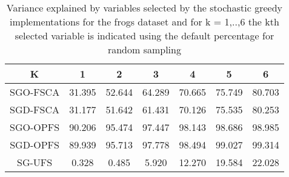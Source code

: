 \begin{table}
	\begin{center}
		\begin{tabular}{c c c c c c c}
			K & 1 & 2 & 3 & 4 & 5 & 6 \\
			\hline
			SGO-FSCA & 31.395 & 52.644 & 64.289 & 70.665 & 75.749 & 80.703 \\
			SGD-FSCA & 31.177 & 51.642 & 61.431 & 70.126 & 75.535 & 80.253 \\
			SGO-OPFS & 90.206 & 95.474 & 97.447 & 98.143 & 98.686 & 98.985 \\
			SGD-OPFS & 89.939 & 95.713 & 97.778 & 98.494 & 99.027 & 99.314 \\
			SG-UFS & 0.328 & 0.485 & 5.920 & 12.270 & 19.584 & 22.028 \\
		\end{tabular}
	\end{center}
	\caption{Variance explained by variables selected by the stochastic greedy implementations for the frogs dataset and for k = 1,..,6 the kth selected variable is indicated using the default percentage for random sampling}
\end{table}